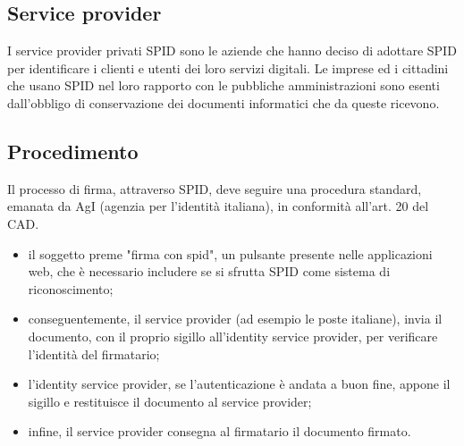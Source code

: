 \subsection{Service provider} 

I service provider privati SPID sono le aziende che hanno deciso di adottare SPID per identificare i clienti e utenti dei loro servizi digitali. Le imprese ed i cittadini che usano SPID nel loro rapporto con le pubbliche amministrazioni sono esenti dall’obbligo di conservazione dei documenti informatici che da queste ricevono.

\subsection{Procedimento}

Il processo di firma, attraverso SPID, deve seguire una procedura standard, emanata da AgI (agenzia per l'identità italiana), in conformità all’art. 20 del CAD.

\begin{itemize}
	\item il soggetto preme "firma con spid", un pulsante presente nelle applicazioni web, che è necessario includere se si sfrutta SPID come sistema di riconoscimento;
	\item conseguentemente, il service provider (ad esempio le poste italiane), invia il documento, con il proprio sigillo all'identity service provider, per verificare l'identità del firmatario;
	\item l'identity service provider, se l'autenticazione è andata a buon fine, appone il sigillo e restituisce il documento al service provider;
	\item infine, il service provider consegna al firmatario il documento firmato.
\end{itemize}

